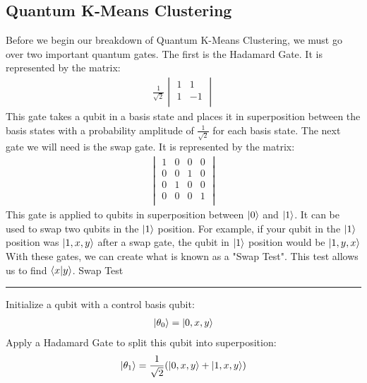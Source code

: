 \documentclass[conference]{IEEEtran}
\begin{document}
\subsection{Quantum K-Means Clustering}
Before we begin our breakdown of Quantum K-Means Clustering, we must go over two important quantum gates. The first is the Hadamard Gate. It is represented by the matrix:
\begin{align*}
\frac{1}{\sqrt{2}}
    \begin{vmatrix}
    1 & 1 \\
    1 & -1 \\
    \end{vmatrix} 
\end{align*} 
This gate takes a qubit in a basis state and places it in superposition between the basis states with a probability amplitude of $\frac{1}{\sqrt{2}}$ for each basis state. The next gate we will need is the swap gate. It is represented by the matrix: \begin{align*}
    \begin{vmatrix}
    1 & 0 & 0 & 0 \\
    0 & 0 & 1 & 0 \\
    0 & 1 & 0 & 0 \\
    0 & 0 & 0 & 1\\
    \end{vmatrix} 
\end{align*} 
This gate is applied to qubits in superposition between $\ket{0}$ and $\ket{1}$. It can be used to swap two qubits in the $\ket{1}$ position. For example, if your qubit in the $\ket{1}$ position was $\ket{1,x,y}$ after a swap gate, the qubit in $\ket{1}$ position would be $\ket{1,y,x}$ \cite{b5}
\newline
\indent With these gates, we can create what is known as a "Swap Test". This test allows us to find $\bra{x}\ket{y}$. \newline
\newline
{\large Swap Test} \newline
\noindent\rule{\columnwidth}{1pt}
\newline
   Initialize a qubit with a control basis qubit: \newline 
 \begin{align*}
 \ket{\theta_0} = \ket{0,x,y} 
 \end{align*} 
   Apply a Hadamard Gate to split this qubit into superposition: \newline
 \begin{align*}
 \ket{\theta_1} = \frac{1}{\sqrt{2}}(\ket{0,x,y}+ \ket{1,x,y}) 
 \end{align*} 
\end{document}
